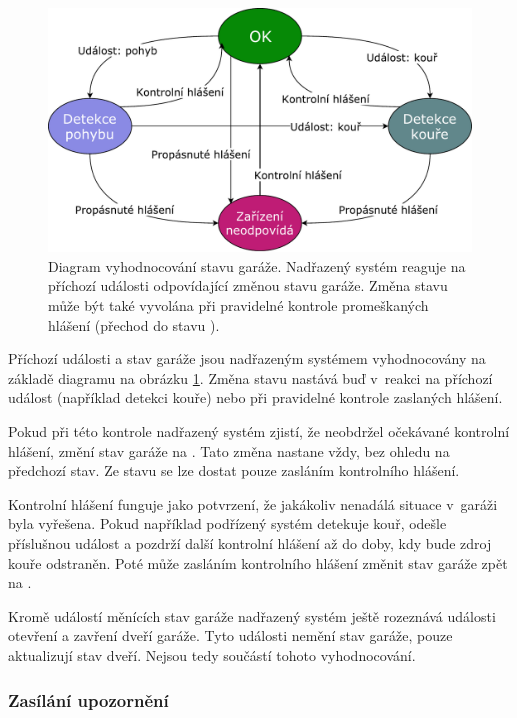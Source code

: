 \begin{figure}[h!]
    \centering
    \includegraphics[width=\textwidth]{images/garage_state.pdf}
    \caption[Diagram vyhodnocování stavu garáže]{Diagram vyhodnocování stavu garáže. Nadřazený systém reaguje na příchozí události odpovídající změnou stavu garáže. Změna stavu může být také vyvolána při pravidelné kontrole promeškaných hlášení (přechod do stavu ).}
    \label{fig:garage_state}
\end{figure}

Příchozí události a stav garáže jsou nadřazeným systémem vyhodnocovány na základě diagramu na obrázku \ref{fig:garage_state}. Změna stavu nastává buď v~reakci na příchozí událost (například detekci kouře) nebo při pravidelné kontrole zaslaných hlášení. 

Pokud při této kontrole nadřazený systém zjistí, že neobdržel očekávané kontrolní hlášení, změní stav garáže na \textcolor{magenta}{}. Tato změna nastane vždy, bez ohledu na předchozí stav. Ze stavu \textcolor{magenta}{} se lze dostat pouze zasláním kontrolního hlášení.

Kontrolní hlášení funguje jako potvrzení, že jakákoliv nenadálá situace v~garáži byla vyřešena. Pokud například podřízený systém detekuje kouř, odešle příslušnou událost a pozdrží další kontrolní hlášení až do doby, kdy bude zdroj kouře odstraněn. Poté může zasláním kontrolního hlášení změnit stav garáže zpět na \textcolor{green}{}.

Kromě událostí měnících stav garáže nadřazený systém ještě rozeznává události otevření a zavření dveří garáže. Tyto události nemění stav garáže, pouze aktualizují stav dveří. Nejsou tedy součástí tohoto vyhodnocování.

\subsubsection{Zasílání upozornění}

